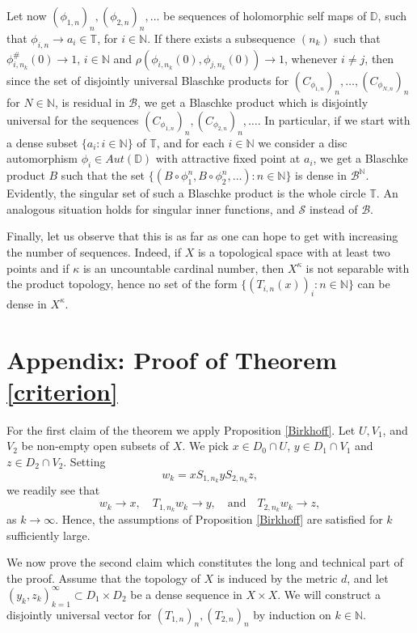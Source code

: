\documentclass[12pt,a4paper]{amsart}
\theoremstyle{plain}
\theoremstyle{definition}
\theoremstyle{remark}
\theoremstyle{fact}
\begin{document}
    Let now $(\phi_{1,n})_n, (\phi_{2,n})_n,\dots$ be sequences of holomorphic self maps of $\mathbb{D}$, such that $\phi_{i,n}\rightarrow a_i\in \mathbb{T}$, for $i\in \mathbb{N}$. If there exists a subsequence $(n_k)$ such that $\phi_{i,n_k}^\#(0)\rightarrow 1$, $i\in \mathbb{N}$ and $\rho(\phi_{i,n_k}(0), \phi_{j,n_k}(0))\rightarrow 1$, whenever $i\neq j$, then since the set of disjointly universal Blaschke products for $(C_{\phi_{1,n}})_n, \dots ,(C_{\phi_{N,n}})_n$ for $N\in \mathbb{N}$, is residual in $\mathcal{B}$, we get a Blaschke product which is disjointly universal for the sequences $(C_{\phi_{1,n}})_n, (C_{\phi_{2,n}})_n,\dots$. In particular, if we start with a dense subset $\{a_i: i\in \mathbb{N}\}$ of $\mathbb{T}$, and for each $i\in \mathbb{N}$ we consider a disc automorphism $\phi_i \in Aut(\mathbb{D})$ with attractive fixed point at $a_i$, we get a Blaschke product $B$ such that the set $\{(B\circ \phi_1^n, B\circ \phi_2^n,\dots): n\in \mathbb{N}\}$ is dense in $\mathcal{B}^{\mathbb{N}}$. Evidently, the singular set of such a Blaschke product is the whole circle $\mathbb{T}$. An analogous situation holds for singular inner functions, and $\mathcal{S}$ instead of $\mathcal{B}$.

    Finally, let us observe that this is as far as one can hope to get with increasing the number of sequences. Indeed, if $X$ is a topological space with at least two points and if $\kappa$ is an uncountable cardinal number, then $X^{\kappa}$ is not separable with the product topology, hence no set of the form $\{ (T_{i,n}(x))_i: n\in \mathbb{N}\}$ can be dense in $X^{\kappa}$. 

    \section{Appendix: Proof of Theorem \ref{criterion}}

    For the first claim of the theorem we apply Proposition \ref{Birkhoff}. Let $U, V_1$, and $V_2$ be non-empty open subsets of $X$. We pick $x\in D_0\cap U$, $y\in D_1\cap V_1$ and $z\in D_2\cap V_2$. Setting
    $$
    w_k=xS_{1, n_k}yS_{2, n_k}z,
    $$
    we readily see that
    $$
    w_k \rightarrow x, \quad T_{1, n_k} w_k \rightarrow y, \quad \mbox{and}  \quad T_{2, n_k} w_k \rightarrow z,   
    $$
   as $k \rightarrow \infty$.
    Hence, the assumptions of Proposition \ref{Birkhoff} are satisfied for $k$ sufficiently large.

    We now prove the second claim which constitutes the long and technical part of the proof.
    Assume that the topology of $X$ is induced by the metric $d$, and let $(y_k,z_k)_{k=1}^{\infty}\subset D_1\times D_2$ be a dense sequence in $X\times X$. We will construct a disjointly universal vector for $(T_{1,n})_n, (T_{2,n})_n$  by induction on $k\in \mathbb{N}$.
\end{document}

